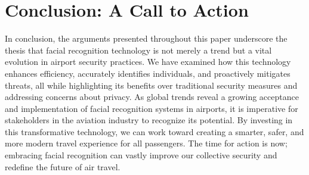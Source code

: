 \documentclass{article}%
\begin{document}
%
\section*{Conclusion: A Call to Action}%
\label{sec:ConclusionACalltoAction}%
In conclusion, the arguments presented throughout this paper underscore the thesis that facial recognition technology is not merely a trend but a vital evolution in airport security practices. We have examined how this technology enhances efficiency, accurately identifies individuals, and proactively mitigates threats, all while highlighting its benefits over traditional security measures and addressing concerns about privacy. As global trends reveal a growing acceptance and implementation of facial recognition systems in airports, it is imperative for stakeholders in the aviation industry to recognize its potential. By investing in this transformative technology, we can work toward creating a smarter, safer, and more modern travel experience for all passengers. The time for action is now; embracing facial recognition can vastly improve our collective security and redefine the future of air travel.

%
\end{document}
